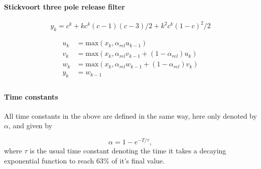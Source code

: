 \documentclass[../main2.tex]{subfiles}
\begin{document}
\paragraph{Stickvoort three pole release filter}
\begin{equation}
y_k = c^k+ k c^k (c - 1)(c - 3)/2 + k^2 c^k (1 - c)^2/2
\end{equation}

\begin{equation}
\begin{split}
u_k &= \text{max}(x_k, \alpha_{rel} u_{k-1}) \\
v_k &= \text{max}(x_k, \alpha_{rel} v_{k-1} + (1-\alpha_{rel}) u_k) \\
w_k &= \text{max}(x_k, \alpha_{rel} w_{k-1} + (1-\alpha_{rel}) v_k)\\
y_k &= w_{k-1} \\
\end{split}
\end{equation}

\paragraph{Time constants}
All time constants in the above are defined in the same way, here only denoted by $\alpha$, and given by

\begin{equation}
\alpha = 1- e^{-T/ \tau},
\end{equation}
where $\tau$ is the usual time constant denoting the time it takes a decaying exponential function to reach $63 \%$ of it's final value.
\end{document}
